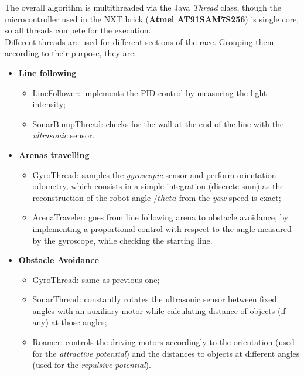 \documentclass[a4paper,11pt,oneside]{book}
\begin{document}
			The overall algorithm is multithreaded via the Java \textit{Thread} class, though the microcontroller used in the NXT brick (\textbf{Atmel AT91SAM7S256}) is single core, so all threads compete for the execution.\\
			
			Different threads are used for different sections of the race. Grouping them according to their purpose, they are:
			
			\begin{itemize}
				\item \textbf{Line following}
					\begin{itemize}
							\item LineFollower: implements the PID control by measuring the light intensity;
						\item SonarBumpThread: checks for the wall at the end of the line with the \textit{ultrasonic} sensor.
					\end{itemize}
				
				\item \textbf{Arenas travelling}
				\begin{itemize}
						\item GyroThread: samples the \textit{gyroscopic} sensor and perform orientation odometry, which consists in a simple integration (discrete sum) as the reconstruction of the robot angle $/theta$ from the \textit{yaw} speed is exact;
					\item ArenaTraveler: goes from line following arena to obstacle avoidance, by implementing a proportional control with respect to the angle measured by the gyroscope, while checking the starting line.
				\end{itemize}
			
				
				\item \textbf{Obstacle Avoidance}
				\begin{itemize}
					\item GyroThread: same as previous one;
					\item SonarThread: constantly rotates the ultrasonic sensor between fixed angles with an auxiliary motor while calculating distance of objects (if any) at those angles;
					\item Roamer: controls the driving motors accordingly to the orientation (used for the \textit{attractive potential}) and the distances to objects at different angles (used for the \textit{repulsive potential}).
				\end{itemize}
				
			\end{itemize}
			\vspace{7mm}
			
\end{document}
